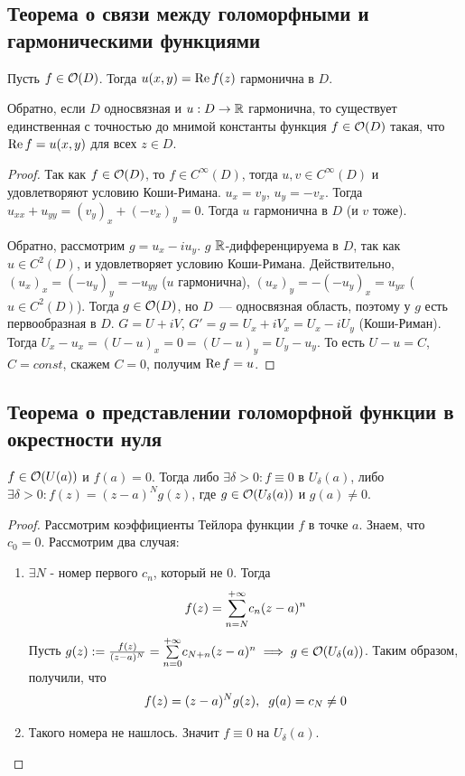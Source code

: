 \subsection{Теорема о связи между голоморфными и гармоническими функциями}
\begin{theorem}
  Пусть $f \in \O(D)$. Тогда $u(x, y) = \Rea f(z)$ гармонична в $D$. 
  
  Обратно, если $D$ односвязная и $u : D \to \R$ гармонична, то существует единственная с точностью до мнимой константы функция $f \in \O(D)$ такая, что $\Rea f = u(x, y)$ для всех $z \in D$.
\end{theorem}
\begin{proof}
  Так как $f \in \O(D)$, то $f \in C^{\infty}(D)$, тогда $u, v \in C^{\infty}(D)$ и удовлетворяют условию Коши-Римана. $u_{x} = v_{y}$, $u_{y} = -v_{x}$. Тогда $u_{xx} + u_{yy} = (v_{y})_{x} + (-v_{x})_{y} = 0$. Тогда $u$ гармонична в $D$ (и $v$ тоже).

  Обратно, рассмотрим $g = u_{x} - iu_{y}$. $g$ $\R$-дифференцируема в $D$, так как $u \in C^{2}(D)$, и удовлетворяет условию Коши-Римана. Действительно, $(u_{x})_{x} = (-u_{y})_{y} = -u_{yy}$ ($u$ гармонична), $(u_{x})_{y} = -(-u_{y})_{x} = u_{yx}$ ($u \in C^{2}(D)$). Тогда $g \in \O(D)$, но $D$~--- односвязная область, поэтому у $g$ есть первообразная в $D$. $G = U + iV$, $G' = g = U_{x} + iV_{x} = U_{x} - iU_{y}$ (Коши-Риман). Тогда $U_{x} - u_{x} = (U - u)_{x} = 0 = (U - u)_{y} = U_{y} - u_{y}$. То есть $U - u = C$, $C = const$, скажем $C = 0$, получим $\Rea f = u$.  
\end{proof}

\subsection{Теорема о представлении голоморфной функции в окрестности нуля}
\begin{theorem}
  $f\in\O(U(a))$ и $f(a)=0$. Тогда либо $\exists \delta>0\colon f\equiv 0$ в $U_\delta(a)$, либо $\exists \delta>0\colon f(z)=(z-a)^Ng(z)$, где $g\in\O(U_\delta(a))$ и $g(a)\neq0$. 
\end{theorem}
\begin{proof}
  Рассмотрим коэффициенты Тейлора функции $f$ в точке $a$. Знаем, что $c_0=0$. Рассмотрим два случая:
  \begin{enumerate}
    \item $\exists N$ - номер первого $c_n$, который не 0. Тогда
    \[f(z)=\Sum{n=N}{+\infty}c_n(z-a)^n\]
    Пусть $g(z):=\frac{f(z)}{(z-a)^N}=\Sum{n=0}{+\infty}c_{N+n}(z-a)^n\implies g\in\O(U_\delta(a))$. Таким образом, получили, что
    \[f(z)=(z-a)^Ng(z),\q g(a)=c_N\neq 0\]
    \item Такого номера не нашлось. Значит $f\equiv 0$ на $U_\delta(a)$. 
  \end{enumerate}
\end{proof}
